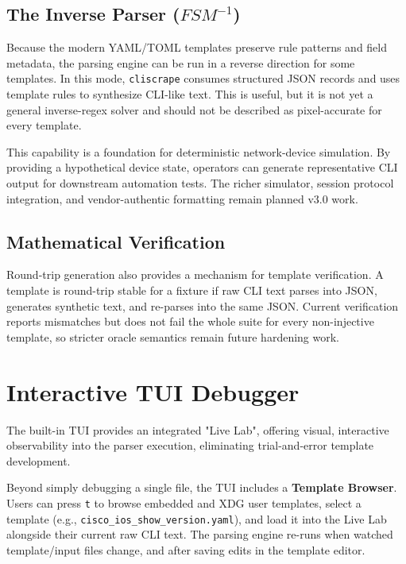 \documentclass[a4paper,10pt]{article}
\begin{document}
\subsection{The Inverse Parser (\texorpdfstring{$FSM^{-1}$}{FSM-1})}
Because the modern YAML/TOML templates preserve rule patterns and field metadata, the parsing engine can be run in a reverse direction for some templates. In this mode, \texttt{cliscrape} consumes structured \ac{JSON} records and uses template rules to synthesize CLI-like text. This is useful, but it is not yet a general inverse-regex solver and should not be described as pixel-accurate for every template.

This capability is a foundation for deterministic network-device simulation. By providing a hypothetical device state, operators can generate representative CLI output for downstream automation tests. The richer simulator, session protocol integration, and vendor-authentic formatting remain planned v3.0 work.

\subsection{Mathematical Verification}
Round-trip generation also provides a mechanism for template verification. A template is round-trip stable for a fixture if raw CLI text parses into \ac{JSON}, generates synthetic text, and re-parses into the same \ac{JSON}. Current verification reports mismatches but does not fail the whole suite for every non-injective template, so stricter oracle semantics remain future hardening work.

\section{Interactive TUI Debugger}
\label{sec:tui}

The built-in \ac{TUI} provides an integrated "Live Lab", offering visual, interactive observability into the parser execution, eliminating trial-and-error template development.

Beyond simply debugging a single file, the TUI includes a \textbf{Template Browser}. Users can press \texttt{t} to browse embedded and XDG user templates, select a template (e.g., \texttt{cisco\_ios\_show\_version.yaml}), and load it into the Live Lab alongside their current raw CLI text. The parsing engine re-runs when watched template/input files change, and after saving edits in the template editor.
\end{document}
